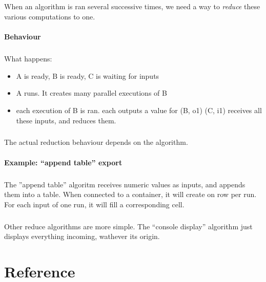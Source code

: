 \documentclass[a4paper,10pt]{book}
\begin{document}
\paragraph*{}
When an algorithm is ran several successive times, we need a way to \textit{reduce} these various computations to one. 


\subsubsection{Behaviour}

\paragraph*{}
What happens: 
\begin{itemize}
\item A is ready, B is ready, C is waiting for inputs
\item A runs. It creates many parallel executions of B
\item each execution of B is ran. each outputs a value for (B, o1) (C, i1) receives all these inputs, and reduces them.
\end{itemize}

\paragraph*{}
The actual reduction behaviour depends on the algorithm.

\subsubsection{Example: ``append table'' export}

\paragraph*{}
The ''append table'' algoritm receives numeric values as inputs, and appends them into a table.
When connected to a container, it will create on row per run. For each input of one run, it will fill a corresponding cell. 

\paragraph*{}
Other reduce algorithms are more simple. The ``console display'' algorithm just displays everything incoming, wathever its origin.

\chapter{Reference}
\end{document}
